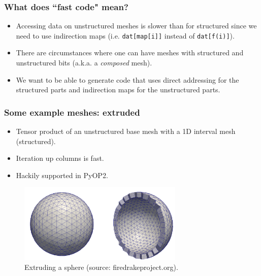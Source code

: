 \documentclass{beamer}
\begin{document}
\begin{frame}
  \frametitle{What does ``fast code" mean?}

  \begin{itemize}
    \item
      Accessing data on unstructured meshes is slower than for structured since we need to use indirection maps (i.e. \texttt{dat[map[i]]} instead of \texttt{dat[f(i)]}).
    \item
    There are circumstances where one can have meshes with structured and unstructured bits (a.k.a. a \textit{composed} mesh).
    \item
      We want to be able to generate code that uses direct addressing for the structured parts and indirection maps for the unstructured parts.
  \end{itemize}
\end{frame}

\begin{frame}
  \frametitle{Some example meshes: extruded}

  \begin{itemize}
    \item
      Tensor product of an unstructured base mesh with a 1D interval mesh (structured).
    \item
      Iteration up columns is fast.
    \item
      Hackily supported in PyOP2.
  \end{itemize}

  \begin{figure}[b]
    \includegraphics[width=0.7\textwidth]{extruded}
    \caption{Extruding a sphere (source: firedrakeproject.org).}
  \end{figure}
\end{frame}
\end{document}
